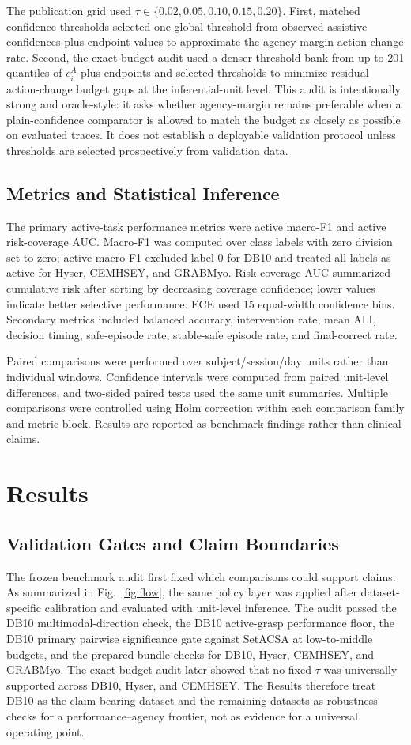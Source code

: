 \documentclass[journal]{IEEEtran}
\begin{document}
The publication grid used $\tau\in\{0.02,0.05,0.10,0.15,0.20\}$. First, matched confidence thresholds selected one global threshold from observed assistive confidences plus endpoint values to approximate the agency-margin action-change rate. Second, the exact-budget audit used a denser threshold bank from up to 201 quantiles of $c_i^A$ plus endpoints and selected thresholds to minimize residual action-change budget gaps at the inferential-unit level. This audit is intentionally strong and oracle-style: it asks whether agency-margin remains preferable when a plain-confidence comparator is allowed to match the budget as closely as possible on evaluated traces. It does not establish a deployable validation protocol unless thresholds are selected prospectively from validation data.

\subsection{Metrics and Statistical Inference}
The primary active-task performance metrics were active macro-F1 and active risk-coverage AUC. Macro-F1 was computed over class labels with zero division set to zero; active macro-F1 excluded label 0 for DB10 and treated all labels as active for Hyser, CEMHSEY, and GRABMyo. Risk-coverage AUC summarized cumulative risk after sorting by decreasing coverage confidence; lower values indicate better selective performance. ECE used 15 equal-width confidence bins. Secondary metrics included balanced accuracy, intervention rate, mean ALI, decision timing, safe-episode rate, stable-safe episode rate, and final-correct rate.

Paired comparisons were performed over subject/session/day units rather than individual windows. Confidence intervals were computed from paired unit-level differences, and two-sided paired tests used the same unit summaries. Multiple comparisons were controlled using Holm correction within each comparison family and metric block. Results are reported as benchmark findings rather than clinical claims.

\section{Results}
\subsection{Validation Gates and Claim Boundaries}
The frozen benchmark audit first fixed which comparisons could support claims. As summarized in Fig.~\ref{fig:flow}, the same policy layer was applied after dataset-specific calibration and evaluated with unit-level inference. The audit passed the DB10 multimodal-direction check, the DB10 active-grasp performance floor, the DB10 primary pairwise significance gate against SetACSA at low-to-middle budgets, and the prepared-bundle checks for DB10, Hyser, CEMHSEY, and GRABMyo. The exact-budget audit later showed that no fixed $\tau$ was universally supported across DB10, Hyser, and CEMHSEY. The Results therefore treat DB10 as the claim-bearing dataset and the remaining datasets as robustness checks for a performance--agency frontier, not as evidence for a universal operating point.
\end{document}

